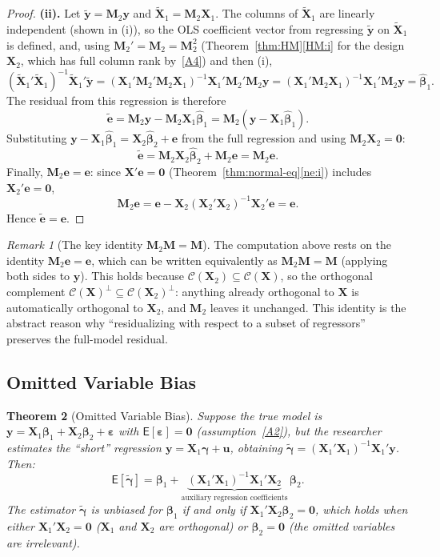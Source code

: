 \documentclass[14pt]{extarticle}
\theoremstyle{plain}
\newtheorem{theorem}{Theorem}[section]
\theoremstyle{definition}
\theoremstyle{remark}
\newtheorem{remark}[theorem]{Remark}
\newcommand\expc{\mathsf{E}}
\newcommand{\bX}{\mathbf{X}}
\newcommand{\by}{\mathbf{y}}
\def\bb{\boldsymbol{\beta}}
\newcommand{\be}{\boldsymbol{\varepsilon}}
\newcommand{\bM}{\mathbf{M}}
\newcommand{\bzero}{\mathbf{0}}
\newcommand{\calC}{\mathcal{C}}
\begin{document}
\begin{proof}
\textbf{(ii).} Let $\tilde{\by} = \bM_2\by$ and $\tilde{\bX}_1 = \bM_2\bX_1$. The columns of $\tilde{\bX}_1$ are linearly independent (shown in (i)), so the OLS coefficient vector from regressing $\tilde{\by}$ on $\tilde{\bX}_1$ is defined, and, using $\bM_2' = \bM_2 = \bM_2^2$ (Theorem~\ref{thm:HM}\ref{HM:i} for the design $\bX_2$, which has full column rank by~\ref{A4}) and then (i),
\[
(\tilde{\bX}_1'\tilde{\bX}_1)^{-1}\tilde{\bX}_1'\tilde{\by} = (\bX_1'\bM_2'\bM_2\bX_1)^{-1}\bX_1'\bM_2'\bM_2\by = (\bX_1'\bM_2\bX_1)^{-1}\bX_1'\bM_2\by = \hat{\bb}_1.
\]
The residual from this regression is therefore
\[
\tilde{\mathbf{e}} = \bM_2\by - \bM_2\bX_1\hat{\bb}_1 = \bM_2(\by - \bX_1\hat{\bb}_1).
\]
Substituting $\by - \bX_1\hat{\bb}_1 = \bX_2\hat{\bb}_2 + \mathbf{e}$ from the full regression and using $\bM_2\bX_2 = \bzero$:
\begin{equation}
\tilde{\mathbf{e}} = \bM_2\bX_2\hat{\bb}_2 + \bM_2\mathbf{e} = \bM_2\mathbf{e}.
\end{equation}
Finally, $\bM_2\mathbf{e} = \mathbf{e}$: since $\bX'\mathbf{e} = \bzero$ (Theorem~\ref{thm:normal-eq}\ref{ne:i}) includes $\bX_2'\mathbf{e} = \bzero$,
\[
\bM_2\mathbf{e} = \mathbf{e} - \bX_2(\bX_2'\bX_2)^{-1}\bX_2'\mathbf{e} = \mathbf{e}.
\]
Hence $\tilde{\mathbf{e}} = \mathbf{e}$.
\end{proof}

\begin{remark}[The key identity $\bM_2\bM = \bM$]\label{rem:M2M}
The computation above rests on the identity $\bM_2\mathbf{e} = \mathbf{e}$, which can be written equivalently as $\bM_2\bM = \bM$ (applying both sides to $\by$). This holds because $\calC(\bX_2) \subseteq \calC(\bX)$, so the orthogonal complement $\calC(\bX)^\perp \subseteq \calC(\bX_2)^\perp$: anything already orthogonal to $\bX$ is automatically orthogonal to $\bX_2$, and $\bM_2$ leaves it unchanged. This identity is the abstract reason why ``residualizing with respect to a subset of regressors'' preserves the full-model residual.
\end{remark}

\subsection{Omitted Variable Bias}

\begin{theorem}[Omitted Variable Bias]\label{thm:ovb}
Suppose the true model is $\by = \bX_1\bb_1 + \bX_2\bb_2 + \be$ with $\expc[\be] = \bzero$ (assumption~\ref{A2}), but the researcher estimates the ``short'' regression $\by = \bX_1\boldsymbol\gamma + \mathbf{u}$, obtaining $\tilde{\boldsymbol\gamma} = (\bX_1'\bX_1)^{-1}\bX_1'\by$. Then:
\begin{equation}\label{eq:ovb}
\expc[\tilde{\boldsymbol\gamma}] = \bb_1 + \underbrace{(\bX_1'\bX_1)^{-1}\bX_1'\bX_2}_{\text{auxiliary regression coefficients}}\,\bb_2.
\end{equation}
The estimator $\tilde{\boldsymbol\gamma}$ is unbiased for $\bb_1$ if and only if $\bX_1'\bX_2\bb_2 = \bzero$, which holds when either $\bX_1'\bX_2 = \bzero$ ($\bX_1$ and $\bX_2$ are orthogonal) or $\bb_2 = \bzero$ (the omitted variables are irrelevant).
\end{theorem}
\end{document}
